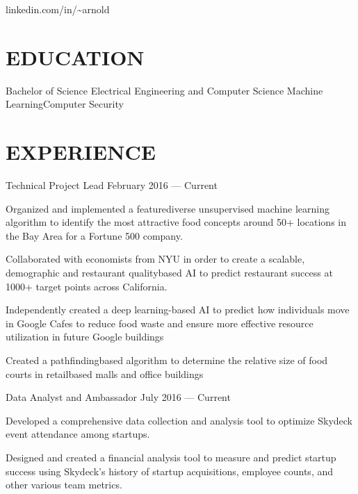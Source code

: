\documentclass[10pt]{article}
\begin{document}
				 {linkedin.com/in/{\textasciitilde}arnold}      

\section*{EDUCATION}

			{Bachelor of Science {\textendash} Electrical Engineering and Computer Science}
			{Machine Learning}{Computer Security}


\section*{EXPERIENCE}

								{Technical Project Lead}
								{February 2016 --- Current}                  		
	                   \begin{accomplishments} 
	                    		\item Organized and implemented a feature{\textendash}diverse unsupervised machine learning algorithm to identify the most attractive food concepts around 50+ locations in the Bay Area for a Fortune 500 company.
	                    		\item Collaborated with economists from NYU in order to create a scalable, demographic and restaurant quality{\textendash}based AI to predict restaurant success at 1000+ target points across California.
	                    		\item Independently created a deep learning-based AI to predict how individuals move in Google Cafes to reduce food waste and ensure more effective resource utilization in future Google buildings
	                    		\item Created a pathfinding{\textendash}based algorithm to determine the relative size of food courts in retail{\textendash}based malls and office buildings
	                    \end{accomplishments}
	                    		
	   		
	   		\employer{Skydeck Berkeley}{Berkeley, CA}
	   			{Data Analyst and Ambassador}
	   			{July 2016 --- Current}
			  		\begin{accomplishments}
	                   		\item Developed a comprehensive data collection and analysis tool to optimize Skydeck event attendance among startups.
	                   		\item Designed and created a financial analysis tool to measure and predict startup success using Skydeck's history of startup acquisitions, employee counts, and other various team metrics.
	                  \end{accomplishments}
                  	 
\end{document}
